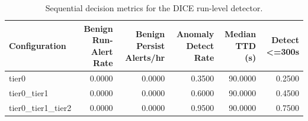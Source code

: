 \begin{table}[t]
\centering
\caption{Sequential decision metrics for the DICE run-level detector.}
\label{tab:dice_sequential_metrics}
\footnotesize
\begin{tabular}{lrrrrr}
\toprule
Configuration & Benign Run-Alert Rate & Benign Persist Alerts/hr & Anomaly Detect Rate & Median TTD (s) & Detect <=300s \\
\midrule
tier0 & 0.0000 & 0.0000 & 0.3500 & 90.0000 & 0.2500 \\
tier0_tier1 & 0.0000 & 0.0000 & 0.6000 & 90.0000 & 0.4500 \\
tier0_tier1_tier2 & 0.0000 & 0.0000 & 0.9500 & 90.0000 & 0.7500 \\
\bottomrule
\end{tabular}

\end{table}
